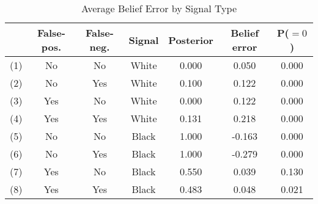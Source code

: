 \begin{table}[H]\centering \caption{Average Belief Error by Signal Type} \begin{tabular}{ccccccc} \hline \hline
 & \textbf{False-pos.}&\textbf{False-neg.}&\textbf{Signal}&\textbf{Posterior}&\textbf{Belief error}& \textbf{P($=0$)}\\ \hline
(1)&No&No&White&0.000&0.050&0.000\\
(2)&No&Yes&White&0.100&0.122&0.000\\
(3)&Yes&No&White&0.000&0.122&0.000\\
(4)&Yes&Yes&White&0.131&0.218&0.000\\
(5)&No&No&Black&1.000&-0.163&0.000\\
(6)&No&Yes&Black&1.000&-0.279&0.000\\
(7)&Yes&No&Black&0.550&0.039&0.130\\
(8)&Yes&Yes&Black&0.483&0.048&0.021\\
\hline \end{tabular} \end{table}
